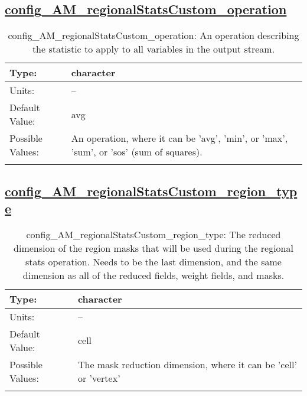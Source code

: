 \subsection[config\_AM\_regionalStatsCustom\_operation]{\hyperref[sec:nm_tab_AM_regionalStatsCustom]{config\_AM\_regionalStatsCustom\_operation}}
\label{subsec:nm_sec_config_AM_regionalStatsCustom_operation}
\begin{center}
\begin{longtable}{| p{2.0in} || p{4.0in} |}
    \hline
    Type: & character \\
    \hline
    Units: & -- \\
    \hline
    Default Value: & avg \\
    \hline
    Possible Values: & An operation, where it can be 'avg', 'min', or 'max', 'sum', or 'sos' (sum of squares). \\
    \hline
    \caption{config\_AM\_regionalStatsCustom\_operation: An operation describing the statistic to apply to all variables in the output stream.}
\end{longtable}
\end{center}
\subsection[config\_AM\_regionalStatsCustom\_region\_type]{\hyperref[sec:nm_tab_AM_regionalStatsCustom]{config\_AM\_regionalStatsCustom\_region\_type}}
\label{subsec:nm_sec_config_AM_regionalStatsCustom_region_type}
\begin{center}
\begin{longtable}{| p{2.0in} || p{4.0in} |}
    \hline
    Type: & character \\
    \hline
    Units: & -- \\
    \hline
    Default Value: & cell \\
    \hline
    Possible Values: & The mask reduction dimension, where it can be 'cell' or 'vertex' \\
    \hline
    \caption{config\_AM\_regionalStatsCustom\_region\_type: The reduced dimension of the region masks that will be used during the regional stats operation. Needs to be the last dimension, and the same dimension as all of the reduced fields, weight fields, and masks.}
\end{longtable}
\end{center}
